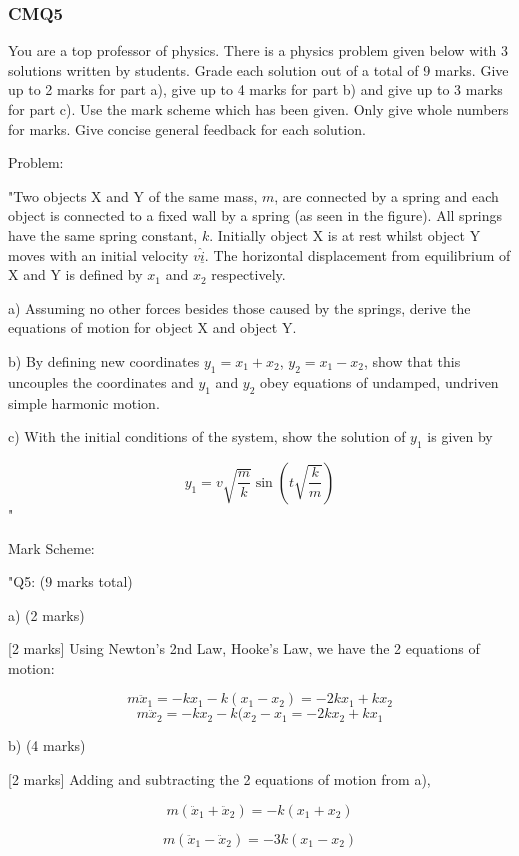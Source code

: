 \subsubsection{CMQ5}

You are a top professor of physics. There is a physics problem given below with 3 solutions written by students. Grade each solution out of a total of 9 marks. Give up to 2 marks for part a), give up to 4 marks for part b) and give up to 3 marks for part c). Use the mark scheme which has been given. Only give whole numbers for marks. Give concise general feedback for each solution.

Problem: 

"Two objects X and Y of the same mass, \( m \), are connected by a spring and each object is connected to a fixed wall by a spring (as seen in the figure). All springs have the same spring constant, \( k \). Initially object X is at rest whilst object Y moves with an initial velocity \( v \hat{\underline{i}} \). The horizontal displacement from equilibrium of X and Y is defined by \( x_{1} \) and \( x_{2} \) respectively. 

a) Assuming no other forces besides those caused by the springs, derive the equations of motion for object X and object Y. 
    
b) By defining new coordinates \( y_{1} = x_{1} + x_{2} \), \( y_{2} = x_{1} - x_{2} \), show that this uncouples the coordinates and \( y_{1} \) and \( y_{2} \) obey equations of undamped, undriven simple harmonic motion. 
    
c) With the initial conditions of the system, show the solution of \( y_{1} \) is given by 
    
\[
y_{1} = v \sqrt{\frac{m}{k}} \sin(t \sqrt{\frac{k}{m}})
\]"

Mark Scheme:

"{Q5: (9 marks total)}

a) (2 marks)

[2 marks] Using Newton’s 2nd Law, Hooke’s Law, we have the 2 equations of motion: 

\[ m \ddot{x}_1 = - k x_1 - k(x_1 - x_2) = -2k x_1 + k x_2 \]
\[ m \ddot{x}_2 = - k x_2 - k(x_2 - x_1 = -2k x_2 + k x_1 \]

b) (4 marks) 

[2 marks] Adding and subtracting the 2 equations of motion from a), 

\[ m( \ddot{x}_1 + \ddot{x}_2 ) = -k(x_1 + x_2) \]

\[ m( \ddot{x}_1 - \ddot{x}_2 ) = -3k(x_1 - x_2) \]

